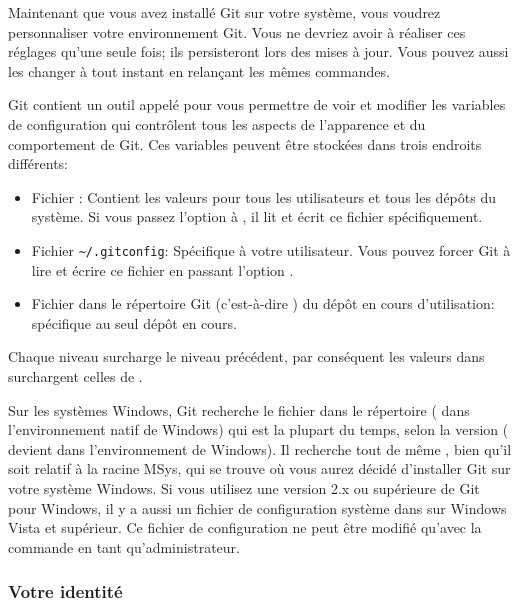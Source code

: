 Maintenant que vous avez installé Git sur votre système, vous voudrez personnaliser votre environnement Git.
Vous ne devriez avoir à réaliser ces réglages qu'une seule fois;
ils persisteront lors des mises à jour.
Vous pouvez aussi les changer à tout instant en relançant les mêmes commandes.

Git contient un outil appelé  pour vous permettre de voir et modifier les variables de configuration qui contrôlent tous les aspects de l'apparence et du comportement de Git.
Ces variables peuvent être stockées dans trois endroits différents:
\begin{itemize}
\item Fichier : Contient les valeurs pour tous les utilisateurs et tous les dépôts du système.
Si vous passez l'option  à , il lit et écrit ce fichier spécifiquement.
\item Fichier \verb=~/.gitconfig=: Spécifique à votre utilisateur.
Vous pouvez forcer Git à lire et écrire ce fichier en passant l'option .
\item Fichier  dans le répertoire Git (c'est-à-dire ) du dépôt en cours d'utilisation: spécifique au seul dépôt en cours.
\end{itemize}
Chaque niveau surcharge le niveau précédent, par conséquent les valeurs dans  surchargent celles de .

Sur les systèmes Windows, Git recherche le fichier  dans le répertoire  ( dans l’environnement natif de Windows) qui est  la plupart du temps, selon la version ( devient  dans l’environnement de Windows).
Il recherche tout de même , bien qu'il soit relatif à la racine MSys, qui se trouve où vous aurez décidé d'installer Git sur votre système Windows.
Si vous utilisez une version 2.x ou supérieure de Git pour Windows, il y a aussi un fichier de configuration système dans  sur Windows Vista et supérieur.
Ce fichier de configuration ne peut être modifié qu'avec la commande  en tant qu'administrateur.

\subsubsection{Votre identité}

